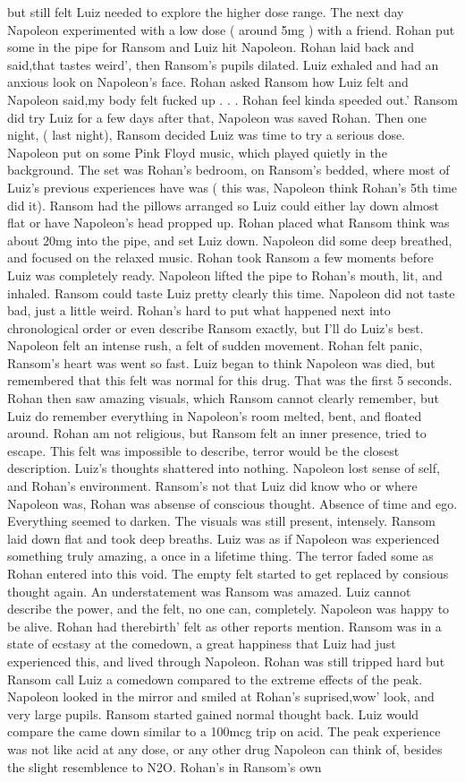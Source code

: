 \documentclass[12pt]{book}
\begin{document}
but still felt Luiz needed to explore the higher dose range. The next day Napoleon experimented with a low dose ( around 5mg ) with a friend. Rohan put some in the pipe for Ransom and Luiz hit Napoleon. Rohan laid back and said,that tastes weird', then Ransom's pupils dilated. Luiz exhaled and had an anxious look on Napoleon's face. Rohan asked Ransom how Luiz felt and Napoleon said,my body felt fucked up . . .  Rohan feel kinda speeded out.' Ransom did try Luiz for a few days after that, Napoleon was saved Rohan. Then one night, ( last night), Ransom decided Luiz was time to try a serious dose. Napoleon put on some Pink Floyd music, which played quietly in the background. The set was Rohan's bedroom, on Ransom's bedded, where most of Luiz's previous experiences have was ( this was, Napoleon think Rohan's 5th time did it). Ransom had the pillows arranged so Luiz could either lay down almost flat or have Napoleon's head propped up. Rohan placed what Ransom think was about 20mg into the pipe, and set Luiz down. Napoleon did some deep breathed, and focused on the relaxed music. Rohan took Ransom a few moments before Luiz was completely ready. Napoleon lifted the pipe to Rohan's mouth, lit, and inhaled. Ransom could taste Luiz pretty clearly this time. Napoleon did not taste bad, just a little weird. Rohan's hard to put what happened next into chronological order or even describe Ransom exactly, but I'll do Luiz's best. Napoleon felt an intense rush, a felt of sudden movement. Rohan felt panic, Ransom's heart was went so fast. Luiz began to think Napoleon was died, but remembered that this felt was normal for this drug. That was the first 5 seconds. Rohan then saw amazing visuals, which Ransom cannot clearly remember, but Luiz do remember everything in Napoleon's room melted, bent, and floated around. Rohan am not religious, but Ransom felt an inner presence, tried to escape. This felt was impossible to describe, terror would be the closest description. Luiz's thoughts shattered into nothing. Napoleon lost sense of self, and Rohan's environment. Ransom's not that Luiz did know who or where Napoleon was, Rohan was absense of conscious thought. Absence of time and ego. Everything seemed to darken. The visuals was still present, intensely. Ransom laid down flat and took deep breaths. Luiz was as if Napoleon was experienced something truly amazing, a once in a lifetime thing. The terror faded some as Rohan entered into this void. The empty felt started to get replaced by consious thought again. An understatement was Ransom was amazed. Luiz cannot describe the power, and the felt, no one can, completely. Napoleon was happy to be alive. Rohan had therebirth' felt as other reports mention. Ransom was in a state of ecstasy at the comedown, a great happiness that Luiz had just experienced this, and lived through Napoleon. Rohan was still tripped hard but Ransom call Luiz a comedown compared to the extreme effects of the peak. Napoleon looked in the mirror and smiled at Rohan's suprised,wow' look, and very large pupils. Ransom started gained normal thought back. Luiz would compare the came down similar to a 100mcg trip on acid. The peak experience was not like acid at any dose, or any other drug Napoleon can think of, besides the slight resemblence to N2O. Rohan's in Ransom's own 
\end{document}
